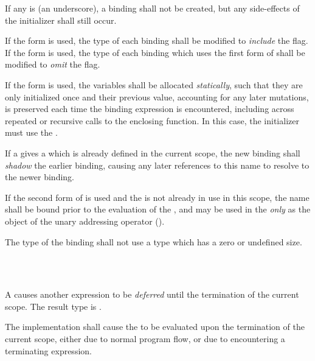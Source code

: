\specsubsubitem
If any  is \terminal{\_} (an underscore), a binding shall not
be created, but any side-effects of the initializer shall still occur.

\specsubsubitem
If the  form is used, the type of each binding shall be
modified to \textit{include} the  flag. If the 
form is used, the type of each binding which uses the first form of
 shall be modified to \textit{omit} the 
flag.

\specsubsubitem
If the  form is used, the variables shall be allocated
\textit{statically}, such that they are only initialized once and their
previous value, accounting for any later mutations, is preserved each time
the binding expression is encountered, including across repeated or recursive
calls to the enclosing function. In this case, the initializer must use the
.

\specsubsubitem
If a  gives a  which is already defined
in the current scope, the new binding shall \textit{shadow} the earlier
binding, causing any later references to this name to resolve to the newer
binding.

\specsubsubitem
If the second form of  is used and the 
is not already in use in this scope, the name shall be bound prior to the
evaluation of the , and may be used in the
 \textit{only} as the object of the unary addressing
operator (\terminal{\&}).

\specsubsubitem
The type of the binding shall not use a type which has a zero or undefined size.


\begin{grammar}
 \\
	  \\
\end{grammar}

\specsubsubitem
A  causes another expression to be
\textit{deferred} until the termination of the current scope. The result type
is .

\specsubsubitem
The implementation shall cause the  to be evaluated
upon the termination of the current scope, either due to normal program flow,
or due to encountering a terminating expression.

